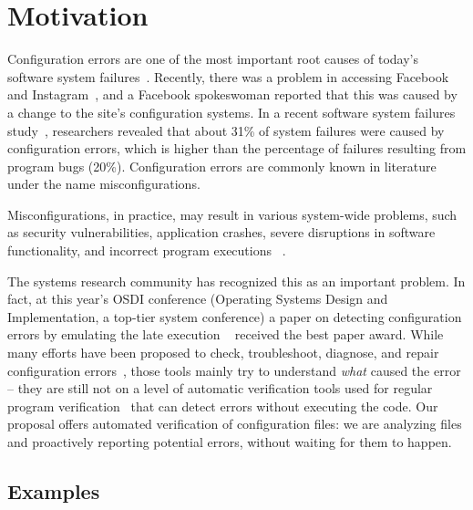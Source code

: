 \section{Motivation}
\label{sec:intro}

Configuration errors are one of the most important root causes of
today's software system failures~\cite{xu15systems, yin11anempirical}.
Recently, there was a problem in accessing  
Facebook and Instagram~\cite{mashableNews}, 
and a Facebook spokeswoman reported that 
this was caused by a change to the site's configuration systems.
In a recent software system failures study~\cite{yin11anempirical},
researchers revealed that about 31\% of system failures were caused by 
configuration errors, which is higher than the percentage of
failures resulting from program bugs (20\%). 
Configuration errors are commonly known in literature 
under the name misconfigurations. 

Misconfigurations, in practice, may result in various
system-wide problems, such as security vulnerabilities, 
application crashes, severe disruptions in software
functionality, and incorrect program executions%
~\cite{zhang14encore, yuan11context, xu13do, xu15hey}. 

The systems research community has recognized this as an important
problem. In fact, at this year's OSDI conference (Operating Systems
Design and Implementation, a top-tier system conference) a paper on
detecting configuration errors by emulating the late execution
 ~\cite{xu16early} received the best paper 
award. While many efforts have been proposed to check, troubleshoot, diagnose, and repair configuration errors~\cite{attariyan10automating,
su07autobash, whitaker04configuration},
those tools mainly try to understand {\emph{what}} caused the 
error -- they are still not on a level of
automatic verification tools used for regular program 
verification~\cite{Leino10Dafny, PiskacWZ14, BobotFMP15} that can
detect errors without executing the code. Our proposal offers 
automated verification of configuration files: we are analyzing 
files and proactively reporting potential errors, without waiting for them to happen.

\subsection{Examples}
\label{sec:intro-examples}

